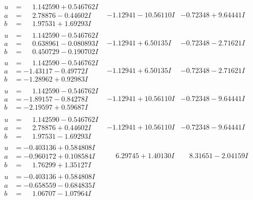 \documentclass[1p]{elsarticle_modified}
\theoremstyle{definition}
\begin{document}
$$\begin{array}{c|c|c}
\begin{aligned}
u &= \phantom{-}1.142590 + 0.546762 I \\
a &= \phantom{-}2.78876 - 0.44602 I \\
b &= \phantom{-}1.97531 + 1.69293 I\end{aligned}
 & -1.12941 - 10.56110 I & -0.72348 + 9.64441 I \\ \hline\begin{aligned}
u &= \phantom{-}1.142590 - 0.546762 I \\
a &= \phantom{-}0.638961 - 0.080893 I \\
b &= \phantom{-}0.450729 - 0.190702 I\end{aligned}
 & -1.12941 + 6.50135 I & -0.72348 - 2.71621 I \\ \hline\begin{aligned}
u &= \phantom{-}1.142590 - 0.546762 I \\
a &= -1.43117 - 0.49772 I \\
b &= -1.28962 + 0.92983 I\end{aligned}
 & -1.12941 + 6.50135 I & -0.72348 - 2.71621 I \\ \hline\begin{aligned}
u &= \phantom{-}1.142590 - 0.546762 I \\
a &= -1.89157 - 0.84278 I \\
b &= -2.19597 + 0.59687 I\end{aligned}
 & -1.12941 + 10.56110 I & -0.72348 - 9.64441 I \\ \hline\begin{aligned}
u &= \phantom{-}1.142590 - 0.546762 I \\
a &= \phantom{-}2.78876 + 0.44602 I \\
b &= \phantom{-}1.97531 - 1.69293 I\end{aligned}
 & -1.12941 + 10.56110 I & -0.72348 - 9.64441 I \\ \hline\begin{aligned}
u &= -0.403136 + 0.584808 I \\
a &= -0.960172 + 0.108584 I \\
b &= \phantom{-}1.76299 + 1.35127 I\end{aligned}
 & \phantom{-}6.29745 + 1.40130 I & \phantom{-}8.31651 - 2.04159 I \\ \hline\begin{aligned}
u &= -0.403136 + 0.584808 I \\
a &= -0.658559 - 0.684835 I \\
b &= \phantom{-}1.06707 - 1.07964 I\end{aligned}

\end{array}$$
\end{document}
